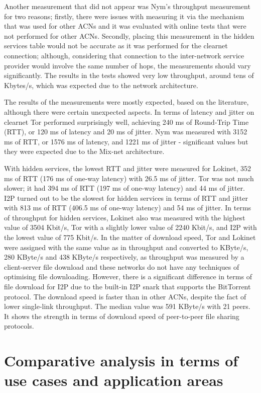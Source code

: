 Another measurement that did not appear was Nym's throughput measurement for two reasons; firstly, there were issues with measuring it via the mechanism that was used for other ACNs and it was evaluated with online tests that were not performed for other ACNs. Secondly, placing this measurement in the hidden services table would not be accurate as it was performed for the clearnet connection; although, considering that connection to the inter-network service provider would involve the same number of hops, the measurements should vary significantly. The results in the tests showed very low throughput, around tens of Kbytes/s, which was expected due to the network architecture. 

The results of the measurements were mostly expected, based on the literature, although there were certain unexpected aspects.
In terms of latency and jitter on clearnet Tor performed surprisingly well, achieving 240 ms of Round-Trip Time (RTT), or 120 ms of latency and 20 ms of jitter. Nym was measured with 3152 ms of RTT, or 1576 ms of latency, and 1221 ms of jitter - significant values but they were expected due to the Mix-net architecture.

With hidden services, the lowest RTT and jitter were measured for Lokinet, 352 ms of RTT (176 ms of one-way latency) with 26.5 ms of jitter. Tor was not much slower; it had 394 ms of RTT (197 ms of one-way latency) and 44 ms of jitter. I2P turned out to be the slowest for hidden services in terms of RTT and jitter with 813 ms of RTT (406.5 ms of one-way latency) and 54 ms of jitter. In terms of throughput for hidden services, Lokinet also was measured with the highest value of 3504 Kbit/s, Tor with a slightly lower value of 2240 Kbit/s, and I2P with the lowest value of 775 Kbit/s. In the matter of download speed, Tor and Lokinet were assigned with the same value as in throughput and converted to KByte/s, 280 KByte/s and 438 KByte/s respectively, as throughput was measured by a client-server file download and these networks do not have any techniques of optimising file downloading. However, there is a significant difference in terms of file download for I2P due to the built-in I2P snark that supports the BitTorrent protocol. The download speed is faster than in other ACNs, despite the fact of lower single-link throughput. The median value was 591 KByte/s with 21 peers. It shows the strength in terms of download speed of peer-to-peer file sharing protocols.


\section{Comparative analysis in terms of use cases and application areas}


